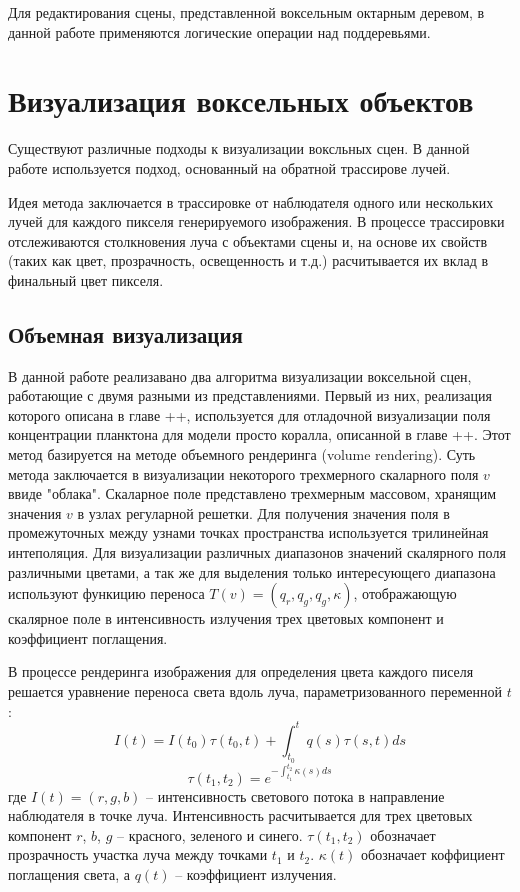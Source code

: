 Для редактирования сцены, представленной воксельным октарным деревом, в данной работе применяются логические операции над поддеревьями.

\section{Визуализация воксельных объектов}

Существуют различные подходы к визуализации воксльных сцен. В данной работе используется подход, основанный на обратной трассирове лучей.

Идея метода заключается в трассировке от наблюдателя одного или нескольких лучей для каждого пикселя генерируемого изображения. В процессе трассировки отслеживаются столкновения луча с объектами сцены и, на основе их свойств (таких как цвет, прозрачность, освещенность и т.д.)  расчитывается их вклад в финальный цвет пикселя.

\subsection{Объемная визуализация}

В данной работе реализавано два алгоритма визуализации воксельной сцен, работающие с двумя разными из представлениями. Первый из них, реализация которого описана в главе ++, используется для отладочной визуализации поля концентрации планктона для модели просто коралла, описанной в главе ++. Этот метод базируется на методе объемного рендеринга (volume rendering). Суть метода заключается в визуализации некоторого трехмерного скаларного поля $v$ ввиде "облака". Скаларное поле представлено трехмерным массовом, хранящим значения $v$ в узлах регуларной решетки. Для получения значения поля в промежуточных между узнами точках пространства используется трилинейная интеполяция. Для визуализации различных диапазонов значений скалярного поля различными цветами, а так же для выделения только интересующего диапазона используют функицию переноса $T(v) = (q_r, q_g, q_g, \kappa)$, отображающую скалярное поле в интенсивность излучения трех цветовых компонент и коэффициент поглащения.

В процессе рендеринга изображения для определения цвета каждого писеля решается уравнение переноса света вдоль луча, параметризованного переменной $t$: 
$$ I(t) = I(t_0)\tau(t_0, t) + \int_{t_0}^t q(s)\tau(s, t) ds $$
$$ \tau(t_1, t_2) = e^{-\int_{t_1}^{t_2} \kappa(s)ds} $$
где $I(t)=(r, g, b)$ -- интенсивность светового потока в направление наблюдателя в точке луча. Интенсивность расчитывается для трех цветовых компонент $r$, $b$, $g$ -- красного, зеленого и синего. $\tau(t_1, t_2)$ обозначает прозрачность участка луча между точками $t_1$ и $t_2$. $\kappa(t)$ обозначает коффициент поглащения света, а $q(t)$ -- коэффициент излучения.

